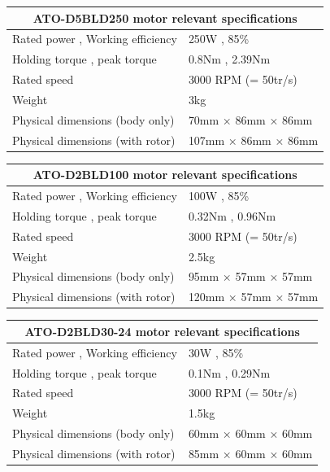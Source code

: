 \documentclass[a4paper]{article}
\begin{document}
	\begin{center}
		\begin{tabular}{| l | l |}
			\hline
			\multicolumn{2}{|c|}{ATO-D5BLD250 motor relevant specifications} \\\hline
			Rated power , Working efficiency & 250W , 85\% \\\hline
			Holding torque , peak torque & 0.8Nm , 2.39Nm \\\hline
			Rated speed & 3000 RPM (= 50tr/s) \\\hline
			Weight & 3kg \\\hline
			Physical dimensions (body only) & 70mm × 86mm × 86mm \\\hline
			Physical dimensions (with rotor) & 107mm × 86mm × 86mm \\\hline
		\end{tabular}
		\begin{tabular}{| l | l |}
			\hline
			\multicolumn{2}{|c|}{ATO-D2BLD100 motor relevant specifications} \\\hline
			Rated power , Working efficiency & 100W , 85\% \\\hline
			Holding torque , peak torque & 0.32Nm , 0.96Nm \\\hline
			Rated speed & 3000 RPM (= 50tr/s) \\\hline
			Weight & 2.5kg \\\hline
			Physical dimensions (body only) & 95mm × 57mm × 57mm \\\hline
			Physical dimensions (with rotor) & 120mm × 57mm × 57mm \\\hline
		\end{tabular}
		\begin{tabular}{| l | l |}
			\hline
			\multicolumn{2}{|c|}{ATO-D2BLD30-24 motor relevant specifications} \\\hline
			Rated power , Working efficiency & 30W , 85\% \\\hline
			Holding torque , peak torque & 0.1Nm , 0.29Nm \\\hline
			Rated speed & 3000 RPM (= 50tr/s) \\\hline
			Weight & 1.5kg \\\hline
			Physical dimensions (body only) & 60mm × 60mm × 60mm \\\hline
			Physical dimensions (with rotor) & 85mm × 60mm × 60mm \\\hline
		\end{tabular}
	\end{center}
	
	\normalsize
	
\end{document}
